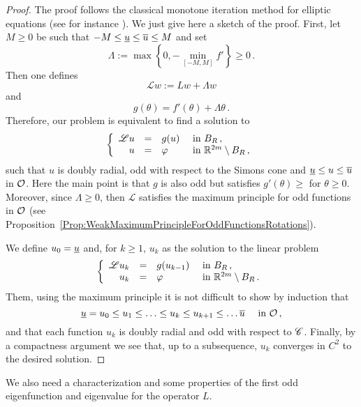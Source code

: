 \begin{proof}
	The proof follows the classical monotone iteration method for elliptic equations (see for instance \cite{Evans}). We just give here a sketch of the proof. 
	First, let $M \geq 0$ be such that $-M \leq \underline{u} \leq \overline{u} \leq M$ and set
	$$
	\Lambda := \max \left \{{0, - \min_{[-M,M]}f'}\right \}\geq 0\,.
	$$
	Then one defines 
	$$
	\mathscr{L}w := Lw + \Lambda w
	$$
	and
	$$
	g(\theta) = f'(\theta) + \Lambda \theta\,.
	$$
	Therefore, our problem is equivalent to find a solution to
	$$
	\left\{\begin{array}{rcll}
	\mathscr{L}u & = & g(u) & \textrm{ in } B_R\,, \\
	u &=& \varphi &  \textrm{ in } \mathbb{R}^{2m} \setminus B_R\,, 
	\end{array} \right.
	$$
	such that $u$ is doubly radial, odd with respect to the Simons cone and  $\underline{u} \leq u \leq \overline{u}$ in $\mathcal{O}$. Here the main point is that $g$ is also odd but satisfies $g'(\theta) \geq $ for $\theta \geq 0$. Moreover, since $\Lambda \geq 0$, then $\mathscr{L}$ satisfies the maximum principle for odd functions in $\mathcal{O}$ (see Proposition~\ref{Prop:WeakMaximumPrincipleForOddFunctionsRotations}).
	
	We define $u_0 = \underline{u}$ and, for $k\geq 1$, $u_k$ as the solution to the linear problem
	$$
	\left\{\begin{array}{rcll}
	\mathscr{L}u_k & = & g(u_{k-1}) & \textrm{ in } B_R\,, \\
	u_k &=& \varphi &  \textrm{ in } \mathbb{R}^{2m} \setminus B_R\,. 
	\end{array} \right.
	$$
	Them, using the maximum principle it is not difficult to show by induction that 
	$$
	\underline{u} = u_0 \leq u_1 \leq \ldots \leq u_k \leq u_{k+1} \leq \ldots \overline{u} \quad \text{ in }\mathcal{O}\,,
	$$
	and that each function $u_k$ is doubly radial and odd with respect to $\mathscr{C}$. Finally, by a compactness argument we see that, up to a subsequence, $u_k$ converges in $C^2$ to the desired solution.
\end{proof}

We also need a characterization and some properties of the first odd eigenfunction and eigenvalue for the operator $L$.

